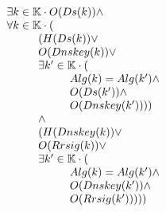 \documentclass[twoside,english, a4paper]{article}
\begin{document}

\begin{equation}
\begin{array}{l}
				\exists k \in \mathbb{K} \cdot O(Ds(k))
				\wedge \\
				\forall k \in \mathbb{K} \cdot (\\
\hskip 1cm			(H(Ds(k)) \vee \\
\hskip 1cm			O(Dnskey(k)) \vee \\
\hskip 1cm				\exists k' \in \mathbb{K} \cdot (\\
\hskip 2cm				Alg(k) = Alg(k') \wedge \\
\hskip 2cm				O(Ds(k')) \wedge \\
\hskip 2cm				O(Dnskey(k')) )) \\
\hskip 1cm			\wedge\\
\hskip 1cm			(H(Dnskey(k)) \vee \\
\hskip 1cm			O(Rrsig(k)) \vee \\
\hskip 1cm			\exists k' \in \mathbb{K} \cdot (\\
\hskip 2cm				Alg(k) = Alg(k') \wedge \\
\hskip 2cm				O(Dnskey(k')) \wedge \\
\hskip 2cm				O(Rrsig(k')) )))
\end{array}
\end{equation}
\end{document}
